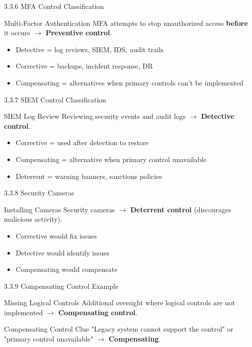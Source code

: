\documentclass{beamer}
\begin{document}
	\begin{frame}{3.3.6 MFA Control Classification}
		\begin{block}{Multi-Factor Authentication}
			MFA attempts to stop unauthorized access \textbf{before} it occurs $\rightarrow$ \textbf{Preventive control}.
		\end{block}
		\begin{itemize}
			\item Detective = log reviews, SIEM, IDS, audit trails
			\item Corrective = backups, incident response, DR
			\item Compensating = alternatives when primary controls can't be implemented
		\end{itemize}
	\end{frame}
	
	\begin{frame}{3.3.7 SIEM Control Classification}
		\begin{block}{SIEM Log Review}
			Reviewing security events and audit logs $\rightarrow$ \textbf{Detective control}.
		\end{block}
		\begin{itemize}
			\item Corrective = used after detection to restore
			\item Compensating = alternative when primary control unavailable
			\item Deterrent = warning banners, sanctions policies
		\end{itemize}
	\end{frame}
	
	\begin{frame}{3.3.8 Security Cameras}
		\begin{block}{Installing Cameras}
			Security cameras $\rightarrow$ \textbf{Deterrent control} (discourages malicious activity).
		\end{block}
		\begin{itemize}
			\item Corrective would fix issues
			\item Detective would identify issues
			\item Compensating would compensate
		\end{itemize}
	\end{frame}
	
	\begin{frame}{3.3.9 Compensating Control Example}
		\begin{block}{Missing Logical Controls}
			Additional oversight where logical controls are not implemented $\rightarrow$ \textbf{Compensating control}.
		\end{block}
		\begin{alertblock}{Compensating Control Clue}
			"Legacy system cannot support the control" or "primary control unavailable" $\rightarrow$ \textbf{Compensating}.
		\end{alertblock}
	\end{frame}
	
\end{document}
